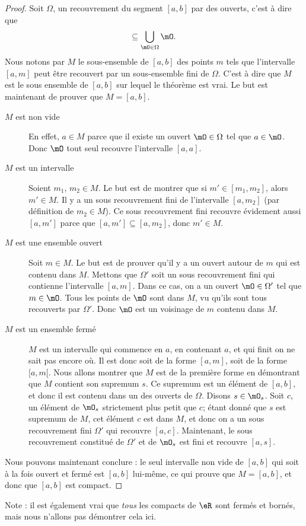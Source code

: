 \begin{proof}
    Soit $\Omega$, un recouvrement du segment $[a,b]$ par des ouverts, c'est à dire que
    \begin{equation}
        [a,b]\subseteq\bigcup_{\mO\in\Omega}\mO.
    \end{equation}
    Nous notons par $M$ le sous-ensemble de $[a,b]$ des points $m$ tels que l'intervalle $[a,m]$ peut être recouvert par un sous-ensemble fini de $\Omega$. C'est à dire que $M$ est le sous ensemble de $[a,b]$ sur lequel le théorème est vrai. Le but est maintenant de prouver que $M=[a,b]$.
    \begin{description}
        \item[$M$ est non vide] En effet, $a\in M$ parce que il existe un ouvert $\mO\in\Omega$ tel que $a\in\mO$. Donc $\mO$ tout seul recouvre l'intervalle $[a,a]$. 
        \item[$M$ est un intervalle] Soient $m_1$, $m_2\in M$. Le but est de montrer que si $m'\in[m_1,m_2]$, alors $m'\in M$. Il y a un sous recouvrement fini de l'intervalle $[a,m_2]$ (par définition de $m_2\in M$). Ce sous recouvrement fini recouvre évidement aussi $[a,m']$ parce que $[a,m']\subseteq [a,m_2]$, donc $m'\in M$.
        \item[$M$ est une ensemble ouvert] Soit $m\in M$. Le but est de prouver qu'il y a un ouvert autour de $m$ qui est contenu dans $M$. Mettons que $\Omega'$ soit un sous recouvrement fini qui contienne l'intervalle $[a,m]$. Dans ce cas, on a un ouvert $\mO\in\Omega'$ tel que $m\in\mO$. Tous les points de $\mO$ sont dans $M$, vu qu'ils sont tous recouverts par $\Omega'$. Donc $\mO$ est un voisinage de $m$ contenu dans $M$.
        \item[$M$ est un ensemble fermé] $M$ est un intervalle qui commence en $a$, en contenant $a$, et qui finit on ne sait pas encore où. Il est donc soit de la forme $[a,m]$, soit de la forme $[a,m[$. Nous allons montrer que $M$ est de la première forme en démontrant que $M$ contient son supremum $s$. Ce supremum est un élément de $[a,b]$, et donc il est contenu dans un des ouverts de $\Omega$. Disons $s\in\mO_s$. Soit $c$, un élément de $\mO_s$ strictement plus petit que $c$; étant donné que $s$ est supremum de $M$, cet élément $c$ est dans $M$, et donc on a un sous recouvrement fini $\Omega'$ qui recouvre $[a,c]$. Maintenant, le sous recouvrement constitué de $\Omega'$ et de $\mO_s$ est fini et recouvre $[a,s]$.
    \end{description}
    Nous pouvons maintenant conclure : le seul intervalle non vide de $[a,b]$ qui soit à la fois ouvert et fermé est $[a,b]$ lui-même, ce qui prouve que $M=[a,b]$, et donc que $[a,b]$ est compact.
\end{proof}
Note : il est également vrai que \emph{tous} les compacts de $\eR$ sont fermés et bornés, mais nous n'allons pas démontrer cela ici.


